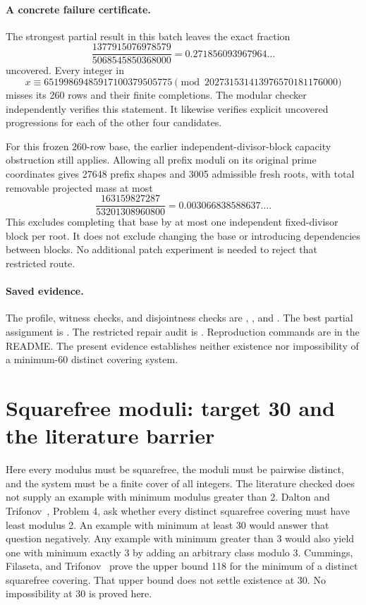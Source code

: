 \documentclass[11pt]{article}
\begin{document}
\paragraph{A concrete failure certificate.}
The strongest partial result in this batch leaves the exact fraction
\[
 \frac{1377915076978579}{5068545850368000}
 =0.271856093967964\ldots
\]
uncovered. Every integer in
\[
 x\equiv65199869485917100379505775
 \pmod{202731531413976570181176000}
\]
misses its 260 rows and their finite completions. The modular checker
independently verifies this statement. It likewise verifies explicit
uncovered progressions for each of the other four candidates.

For this frozen 260-row base, the earlier independent-divisor-block
capacity obstruction still applies. Allowing all prefix moduli on its
original prime coordinates gives 27648 prefix shapes and 3005 admissible
fresh roots, with total removable projected mass at most
\[
 \frac{163159827287}{53201308960800}=0.003066838588637\ldots.
\]
This excludes completing that base by at most one independent fixed-divisor
block per root. It does not exclude changing the base or introducing
dependencies between blocks. No additional patch experiment is needed
to reject that restricted route.

\paragraph{Saved evidence.}
The profile, witness checks, and disjointness checks are
,
, and
.
The best partial assignment is
.
The restricted repair audit is
.
Reproduction commands are in the README. The present evidence establishes
neither existence nor impossibility of a minimum-60 distinct covering system.

\section{Squarefree moduli: target 30 and the literature barrier}
\label{sec:squarefree30}

Here every modulus must be squarefree, the moduli must be pairwise distinct,
and the system must be a finite cover of all integers. The literature checked
does not supply an example with minimum modulus greater than 2.
Dalton and Trifonov~\cite{daltontrifonov}, Problem 4, ask whether every
distinct squarefree covering must have least modulus 2. An example with
minimum at least 30 would answer that question negatively. Any example
with minimum greater than 3 would also yield one with minimum exactly 3
by adding an arbitrary class modulo 3.
Cummings, Filaseta, and Trifonov~\cite{cft} prove the upper bound 118 for
the minimum of a distinct squarefree covering. That upper bound does not
settle existence at 30. No impossibility at 30 is proved here.
\end{document}
